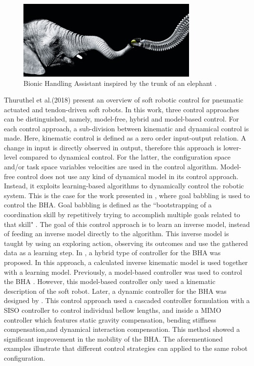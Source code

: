 \begin{figure}[H]
    \centering
    \includegraphics[width = 0.8\textwidth]{Figures/BHAelephant.jpg}
    \caption{Bionic Handling Assistant inspired by the trunk of an elephant \cite{BHA}.}
    \label{fig:BHA}
\end{figure}

Thuruthel et al.(2018) \cite{george2018control} present an overview of soft robotic control for pneumatic actuated and tendon-driven soft robots. In this work, three control approaches can be distinguished, namely, model-free, hybrid and model-based control. For each control approach, a sub-division between kinematic and dynamical control is made. Here, kinematic control is defined as a zero order input-output relation. A change in input is directly observed in output, therefore this approach is lower-level compared to dynamical control. For the latter, the configuration space and/or task space variables velocities are used in the control algorithm. Model-free control does not use any kind of dynamical model in its control approach. Instead, it exploits learning-based algorithms to dynamically control the robotic system. This is the case for the work presented in \cite{rolf2013efficient}, where goal babbling is used to control the BHA. Goal babbling is defined as the ``bootstrapping of a coordination skill by repetitively trying to accomplish multiple goals related to that skill" \cite{rolf2012goal}. The goal of this control approach is to learn an inverse model, instead of feeding an inverse model directly to the algorithm. This inverse model is taught by using an exploring action, observing its outcomes and use the gathered data as a learning step. In \cite{reinhart2017hybrid}, a hybrid type of controller for the BHA was proposed. In this approach, a calculated inverse kinematic model is used together with a learning model. Previously, a model-based controller was used to control the BHA \cite{mahl2014bhakin}. However, this model-based controller only used a kinematic description of the soft robot. Later, a dynamic controller for the BHA was designed by \cite{falkenhahn2016dynamic}. This control approach used a cascaded controller formulation with a SISO controller to control individual bellow lengths, and inside a MIMO controller which features static gravity compensation, bending stiffness compensation,and dynamical interaction compensation. This method showed a significant improvement in the mobility of the BHA. The aforementioned examples illustrate that different control strategies can applied to the same robot configuration. 

